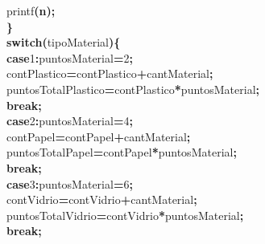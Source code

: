 \documentclass[a4paper, 10pt]{article}
\newcommand\SPC{\hspace*{0.6em}}
\newcommand\TAB{\hspace*{1.2em}}
\newcommand\BS{\mbox{\char 92}}
\newcommand\QOT{\mbox{\char 34}}
\newcommand{\CppAIdentifier}[1]{#1}
\newcommand{\CppANumber}[1]{\textcolor[rgb]{0.5,0,0.5}{#1}}
\newcommand{\CppAReservedWord}[1]{\textbf{#1}}
\newcommand{\CppASpace}[1]{\colorbox[rgb]{1,1,1}{#1}}
\newcommand{\CppAString}[1]{\textbf{\textcolor[rgb]{0,0,1}{#1}}}
\newcommand{\CppASymbol}[1]{\textbf{\textcolor[rgb]{1,0,0}{#1}}}
\begin{document}
\begin{ttfamily}
\CppASpace{\TAB \TAB }\CppAIdentifier{printf}\CppASymbol{(}\CppAString{\QOT \BS n\QOT }\CppASymbol{)}\CppASymbol{;}\\
\CppASpace{\TAB \TAB }\CppASymbol{\}}\\
\CppASpace{\TAB \TAB }\CppAReservedWord{switch}\CppASymbol{(}\CppAIdentifier{tipoMaterial}\CppASymbol{)}\CppASymbol{\{}\\
\CppASpace{\TAB \TAB \TAB }\CppAReservedWord{case}\CppASpace{\SPC }\CppANumber{1}\CppASymbol{:}\CppASpace{\SPC }\CppAIdentifier{puntosMaterial}\CppASymbol{=}\CppANumber{2}\CppASymbol{;}\\
\CppASpace{\TAB \TAB \TAB \TAB \TAB }\CppAIdentifier{contPlastico}\CppASymbol{=}\CppAIdentifier{contPlastico}\CppASymbol{+}\CppAIdentifier{cantMaterial}\CppASymbol{;}\\
\CppASpace{\TAB \TAB \TAB \TAB \TAB }\CppAIdentifier{puntosTotalPlastico}\CppASymbol{=}\CppAIdentifier{contPlastico}\CppASymbol{*}\CppAIdentifier{puntosMaterial}\CppASymbol{;}\\
\CppASpace{\TAB \TAB \TAB \TAB \TAB }\CppAReservedWord{break}\CppASymbol{;}\\
\CppASpace{\TAB \TAB \TAB }\CppAReservedWord{case}\CppASpace{\SPC }\CppANumber{2}\CppASymbol{:}\CppASpace{\SPC }\CppAIdentifier{puntosMaterial}\CppASymbol{=}\CppANumber{4}\CppASymbol{;}\\
\CppASpace{\TAB \TAB \TAB \TAB \TAB }\CppAIdentifier{contPapel}\CppASymbol{=}\CppAIdentifier{contPapel}\CppASymbol{+}\CppAIdentifier{cantMaterial}\CppASymbol{;}\\
\CppASpace{\TAB \TAB \TAB \TAB \TAB }\CppAIdentifier{puntosTotalPapel}\CppASymbol{=}\CppAIdentifier{contPapel}\CppASymbol{*}\CppAIdentifier{puntosMaterial}\CppASymbol{;}\\
\CppASpace{\TAB \TAB \TAB \TAB \TAB }\CppAReservedWord{break}\CppASymbol{;}\\
\CppASpace{\TAB \TAB \TAB }\CppAReservedWord{case}\CppASpace{\SPC }\CppANumber{3}\CppASymbol{:}\CppASpace{\SPC }\CppAIdentifier{puntosMaterial}\CppASymbol{=}\CppANumber{6}\CppASymbol{;}\\
\CppASpace{\TAB \TAB \TAB \TAB \TAB }\CppAIdentifier{contVidrio}\CppASymbol{=}\CppAIdentifier{contVidrio}\CppASymbol{+}\CppAIdentifier{cantMaterial}\CppASymbol{;}\\
\CppASpace{\TAB \TAB \TAB \TAB \TAB }\CppAIdentifier{puntosTotalVidrio}\CppASymbol{=}\CppAIdentifier{contVidrio}\CppASymbol{*}\CppAIdentifier{puntosMaterial}\CppASymbol{;}\\
\CppASpace{\TAB \TAB \TAB \TAB \TAB }\CppAReservedWord{break}\CppASymbol{;}\\

\end{ttfamily}
\end{document}
